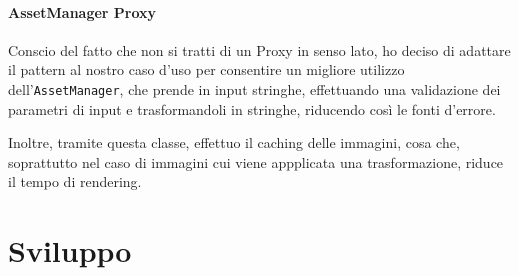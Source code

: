 \documentclass[a4paper,12pt]{report}
\begin{document}
    \subsubsection{AssetManager Proxy}
    \par Conscio del fatto che non si tratti di un Proxy in senso lato, ho deciso di adattare il pattern al nostro caso
    d'uso per consentire un migliore utilizzo dell'\texttt{AssetManager}, che prende in input stringhe, effettuando una
    validazione dei parametri di input e trasformandoli in stringhe, riducendo così le fonti d'errore.
    \par Inoltre, tramite questa classe, effettuo il caching delle immagini, cosa che, soprattutto nel caso di immagini
    cui viene appplicata una trasformazione, riduce il tempo di rendering.
    \chapter{Sviluppo}
\end{document}
